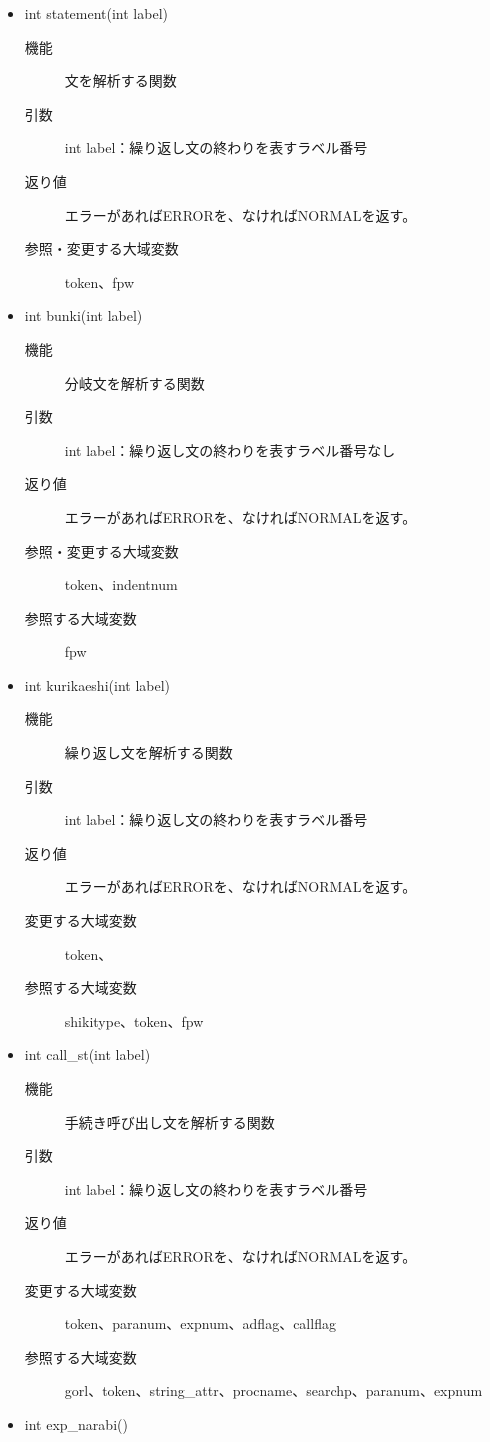 \documentclass{jarticle}
\begin{document}
\begin{itemize}
\begin{description}
\item[参照・変更する大域変数]token
\end{description}
\item int statement(int label)
\begin{description}
\item[機能]文を解析する関数
\item[引数]int label：繰り返し文の終わりを表すラベル番号
\item[返り値]エラーがあればERRORを、なければNORMALを返す。
\item[参照・変更する大域変数]token、fpw
\end{description}
\item int bunki(int label)
\begin{description}
\item[機能]分岐文を解析する関数
\item[引数]int label：繰り返し文の終わりを表すラベル番号なし
\item[返り値]エラーがあればERRORを、なければNORMALを返す。
\item[参照・変更する大域変数]token、indentnum
\item[参照する大域変数]fpw
\end{description}
\item int kurikaeshi(int label)
\begin{description}
\item[機能]繰り返し文を解析する関数
\item[引数]int label：繰り返し文の終わりを表すラベル番号
\item[返り値]エラーがあればERRORを、なければNORMALを返す。
\item[変更する大域変数]token、
\item[参照する大域変数]shikitype、token、fpw
\end{description}
\item int call\_st(int label)
\begin{description}
\item[機能]手続き呼び出し文を解析する関数
\item[引数]int label：繰り返し文の終わりを表すラベル番号
\item[返り値]エラーがあればERRORを、なければNORMALを返す。
\item[変更する大域変数]token、paranum、expnum、adflag、callflag
\item[参照する大域変数]gorl、token、string\_attr、procname、searchp、paranum、expnum
\end{description}
\item int exp\_narabi()

\end{itemize}
\end{document}
